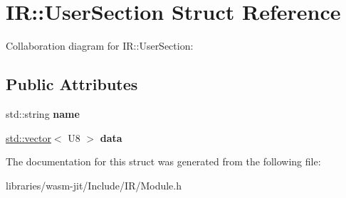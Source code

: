 \hypertarget{struct_i_r_1_1_user_section}{}\section{IR\+:\+:User\+Section Struct Reference}
\label{struct_i_r_1_1_user_section}


Collaboration diagram for IR\+:\+:User\+Section\+:
\subsection*{Public Attributes}
\begin{DoxyCompactItemize}
\item 
\mbox{\label{struct_i_r_1_1_user_section_a519065c948e222555d049e7517d9e791}} 
std\+::string {\bfseries name}
\item 
\mbox{\label{struct_i_r_1_1_user_section_abefb00e1d63458c59e741d7e05bd1c38}} 
\mbox{\hyperlink{classstd_1_1vector}{std\+::vector}}$<$ U8 $>$ {\bfseries data}
\end{DoxyCompactItemize}


The documentation for this struct was generated from the following file\+:\begin{DoxyCompactItemize}
\item 
libraries/wasm-\/jit/\+Include/\+I\+R/Module.\+h\end{DoxyCompactItemize}
